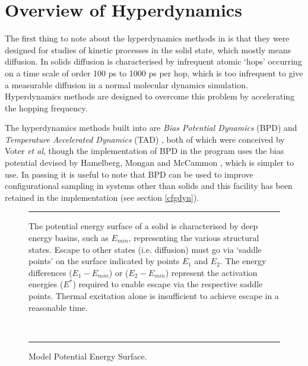 \section{Overview of Hyperdynamics}
The first thing to note about the hyperdynamics methods in
\D{} is that they were designed for studies of kinetic processes in 
the solid state, which mostly means diffusion. In solids diffusion is
characterised by infrequent atomic `hops' occurring on a time scale of
order 100 ps to 1000 ps per hop, which is too infrequent to give a
measurable diffusion in a normal molecular dynamics
simulation. Hyperdynamics methods are designed to overcome this
problem by accelerating the hopping frequency.

The hyperdynamics methods built into \D{} are {\em Bias Potential
Dynamics} (BPD) \cite{voter-97a} and {\em Temperature Accelerated
Dynamics} (TAD) \cite{voter-00a}, both of which were conceived by
Voter {\em et al}, though the implementation of BPD in the program
uses the bias potential devised by Hamelberg, Mongan and McCammon
\cite{hamelberg-04a}, which is simpler to use. 
In passing it is useful to note that BPD can be used to improve
configurational sampling in systems other than solids and this
facility has been retained in the \D{} implementation (see section
\ref{cfgdyn}).

\begin{figure}[ht]
\hrule
\vspace{1.0cm}
\begin{center}
\centerline{}
\end{center}
\caption{Model Potential Energy Surface.\label{potsurf}}
The potential energy surface of a solid is characterised by deep
energy basins, such as $E_{min}$, representing the various structural
states. Escape to other states (i.e. diffusion) must go via `saddle
points' on the surface indicated by points $E_{1}$ and $E_{2}$. The
energy differences ($E_{1}-E_{min}$) or ($E_{2}-E_{min}$) represent
the activation energies ($E^{*}$) required to enable escape via the
respective saddle points. Thermal excitation alone is insufficient to
achieve escape in a reasonable time.

~
\hrule
\end{figure}

